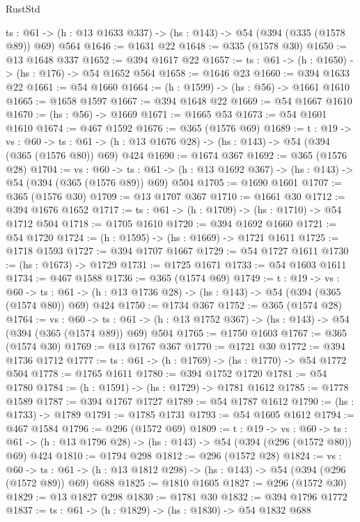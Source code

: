 \begin{lexlean}{RustStd}
\begin{coremodule}
{\begin{coremodule}
{{{{{{{{  {ts : @61} -> (h : @13 @1633 @337) -> (hs : @143) -> @54 (@394 (@335 (@1578 @89)) @69) @564
@1646 := @1631 @22
@1648 := @335 (@1578 @30)
@1650 := @13 @1648 @337
@1652 := @394 @1617 @22
@1657 := {ts : @61} -> (h : @1650) -> (hs : @176) -> @54 @1652 @564
@1658 := @1646 @23
@1660 := @394 @1633 @22
@1661 := @54 @1660
@1664 := (h : @1599) -> (hs : @56) -> @1661 @1610
@1665 := @1658 @1597
@1667 := @394 @1648 @22
@1669 := @54 @1667 @1610
@1670 := (hs : @56) -> @1669
@1671 := @1665 @53
@1673 := @54 @1601 @1610
@1674 := @467 @1592
@1676 := @365 (@1576 @69)
@1689 := {t : @19} ->
  {vs : @60} ->
  {ts : @61} -> (h : @13 @1676 @28) -> (hs : @143) -> @54 (@394 (@365 (@1576 @80)) @69) @424
@1690 := @1674 @367
@1692 := @365 (@1576 @28)
@1704 := {vs : @60} ->
  {ts : @61} -> (h : @13 @1692 @367) -> (hs : @143) -> @54 (@394 (@365 (@1576 @89)) @69) @504
@1705 := @1690 @1601
@1707 := @365 (@1576 @30)
@1709 := @13 @1707 @367
@1710 := @1661 @30
@1712 := @394 @1676 @1652
@1717 := {ts : @61} -> (h : @1709) -> (hs : @1710) -> @54 @1712 @504
@1718 := @1705 @1610
@1720 := @394 @1692 @1660
@1721 := @54 @1720
@1724 := (h : @1595) -> (hs : @1669) -> @1721 @1611
@1725 := @1718 @1593
@1727 := @394 @1707 @1667
@1729 := @54 @1727 @1611
@1730 := (hs : @1673) -> @1729
@1731 := @1725 @1671
@1733 := @54 @1603 @1611
@1734 := @467 @1588
@1736 := @365 (@1574 @69)
@1749 := {t : @19} ->
  {vs : @60} ->
  {ts : @61} -> (h : @13 @1736 @28) -> (hs : @143) -> @54 (@394 (@365 (@1574 @80)) @69) @424
@1750 := @1734 @367
@1752 := @365 (@1574 @28)
@1764 := {vs : @60} ->
  {ts : @61} -> (h : @13 @1752 @367) -> (hs : @143) -> @54 (@394 (@365 (@1574 @89)) @69) @504
@1765 := @1750 @1603
@1767 := @365 (@1574 @30)
@1769 := @13 @1767 @367
@1770 := @1721 @30
@1772 := @394 @1736 @1712
@1777 := {ts : @61} -> (h : @1769) -> (hs : @1770) -> @54 @1772 @504
@1778 := @1765 @1611
@1780 := @394 @1752 @1720
@1781 := @54 @1780
@1784 := (h : @1591) -> (hs : @1729) -> @1781 @1612
@1785 := @1778 @1589
@1787 := @394 @1767 @1727
@1789 := @54 @1787 @1612
@1790 := (hs : @1733) -> @1789
@1791 := @1785 @1731
@1793 := @54 @1605 @1612
@1794 := @467 @1584
@1796 := @296 (@1572 @69)
@1809 := {t : @19} ->
  {vs : @60} ->
  {ts : @61} -> (h : @13 @1796 @28) -> (hs : @143) -> @54 (@394 (@296 (@1572 @80)) @69) @424
@1810 := @1794 @298
@1812 := @296 (@1572 @28)
@1824 := {vs : @60} ->
  {ts : @61} -> (h : @13 @1812 @298) -> (hs : @143) -> @54 (@394 (@296 (@1572 @89)) @69) @688
@1825 := @1810 @1605
@1827 := @296 (@1572 @30)
@1829 := @13 @1827 @298
@1830 := @1781 @30
@1832 := @394 @1796 @1772
@1837 := {ts : @61} -> (h : @1829) -> (hs : @1830) -> @54 @1832 @688
}}}}}}}}
\end{coremodule}}
\end{coremodule}
\end{lexlean}
